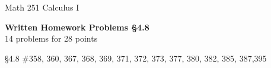\documentclass[11pt]{report}
\theoremstyle{plain}
\begin{document}
\hfill Math 251 Calculus I
\begin{center}
\Large{\textbf{Written Homework Problems \S 4.8}} \\
14 problems for 28 points\\
\end{center}

\begin{description}
\item{\S 4.8} \#358, 360, 367, 368, 369, 371, 372, 373, 377, 380, 382, 385, 387,395\\


\end{description}
\end{document}
